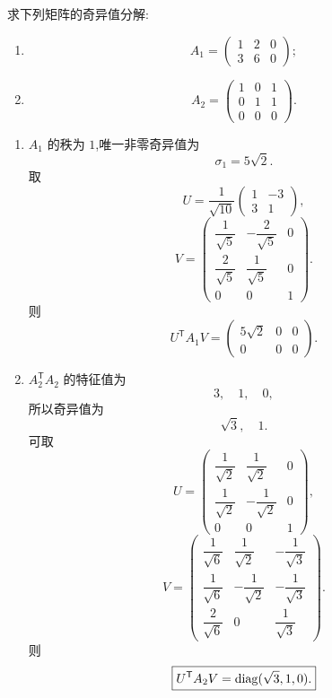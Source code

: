 \begin{example}
求下列矩阵的奇异值分解:
\begin{enumerate}
    \item
    \[
    A_1=
    \begin{pmatrix}
    1&2&0\\
    3&6&0
    \end{pmatrix};
    \]
    \item
    \[
    A_2=
    \begin{pmatrix}
    1&0&1\\
    0&1&1\\
    0&0&0
    \end{pmatrix}.
    \]
\end{enumerate}
\end{example}
\exampleblank

\begin{solution}
\leavevmode
\begin{enumerate}
    \item $A_1$ 的秩为 $1$,唯一非零奇异值为
    \[
    \sigma_1=5\sqrt2.
    \]
    取
    \[
    U=
    \dfrac1{\sqrt{10}}
    \begin{pmatrix}
    1&-3\\
    3&1
    \end{pmatrix},
    \]
    \[
    V=
    \begin{pmatrix}
    \dfrac1{\sqrt5}&-\dfrac2{\sqrt5}&0\\[4pt]
    \dfrac2{\sqrt5}&\dfrac1{\sqrt5}&0\\
    0&0&1
    \end{pmatrix}.
    \]
    则
    \[
    \boxed{
    U^{\mathsf T}A_1V
    =
    \begin{pmatrix}
    5\sqrt2&0&0\\
    0&0&0
    \end{pmatrix}.
    }
    \]

    \item $A_2^{\mathsf T}A_2$ 的特征值为
    \[
    3,\quad1,\quad0,
    \]
    所以奇异值为
    \[
    \sqrt3,\quad1.
    \]
    可取
    \[
    U=
    \begin{pmatrix}
    \dfrac1{\sqrt2}&\dfrac1{\sqrt2}&0\\[4pt]
    \dfrac1{\sqrt2}&-\dfrac1{\sqrt2}&0\\
    0&0&1
    \end{pmatrix},
    \]
    \[
    V=
    \begin{pmatrix}
    \dfrac1{\sqrt6}&\dfrac1{\sqrt2}&-\dfrac1{\sqrt3}\\[4pt]
    \dfrac1{\sqrt6}&-\dfrac1{\sqrt2}&-\dfrac1{\sqrt3}\\[4pt]
    \dfrac2{\sqrt6}&0&\dfrac1{\sqrt3}
    \end{pmatrix}.
    \]
    则
    \[
    \boxed{
    U^{\mathsf T}A_2V
    =
    \operatorname{diag}(\sqrt3,1,0).
    }
    \]
\end{enumerate}
\end{solution}



